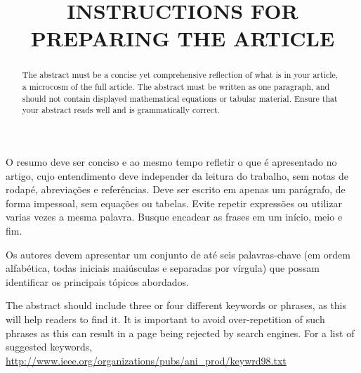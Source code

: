 

\title{INSTRUCTIONS FOR PREPARING THE ARTICLE} %

\maketitle



\begin{resumo}  O resumo deve ser conciso e ao mesmo tempo refletir o que é apresentado no artigo, cujo entendimento deve independer da leitura do trabalho, sem notas de rodapé, abreviações e referências. Deve ser escrito em apenas um parágrafo, de forma impessoal, sem equações ou tabelas. Evite repetir expressões ou utilizar varias vezes a mesma palavra. Busque encadear as frases em um início, meio e fim.
\end{resumo}

\begin{palavraschave }
		Os autores devem apresentar um conjunto de até seis palavras-chave (em ordem alfabética, todas iniciais maiúsculas e separadas por vírgula) que possam identificar os principais tópicos abordados.	
\end{palavraschave }

\englishtitle

\begin{abstract}
	The abstract must be a concise yet comprehensive reflection of what is in your article, a microcosm of the full article. The abstract must be written as one paragraph, and should not contain displayed mathematical equations or tabular material.  Ensure that your abstract reads well and is grammatically correct.
\end{abstract}

\begin{keywords}
	The abstract should include three or four different keywords or phrases, as this will help readers to find it. It is important to avoid over-repetition of such phrases as this can result in a page being rejected by search engines. For a list of suggested keywords, \url{http://www.ieee.org/organizations/pubs/ani_prod/keywrd98.txt}
\end{keywords}

